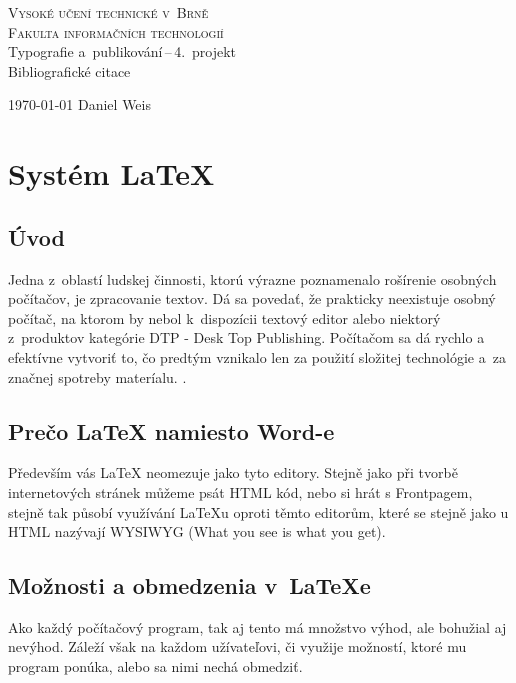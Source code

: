\documentclass[a4paper, 11pt]{article}
\begin{document}
	\begin{titlepage}
		\begin{center}
			\Huge
			\textsc{Vysoké učení technické v~Brně} \\
			\huge
			\textsc{Fakulta informačních technologií} \\
			\LARGE
			Typografie a~publikování\,--\,4.~projekt \\
			\Huge
			Bibliografické citace
		\end{center}

		{\Large
			\today
			\hfill
			Daniel Weis
		}
	\end{titlepage}


	
	\section{Systém \LaTeX}

	\subsection{Úvod}
	Jedna z~oblastí ludskej činnosti, ktorú výrazne poznamenalo rošírenie osobných počítačov, je zpracovanie 	textov. Dá sa povedať, že prakticky neexistuje osobný počítač, na ktorom by nebol k~dispozícii textový 			editor alebo niektorý z~produktov kategórie DTP - Desk Top Publishing. Počítačom sa dá rychlo a~ 				efektívne vytvoriť to, čo predtým vznikalo len za použití složitej technológie a~za značnej spotreby 			materíalu. \cite{Rybicka2003}.
	\subsection{Prečo {\LaTeX} namiesto Word-e}
	Především vás LaTeX neomezuje jako tyto editory. Stejně jako při tvorbě internetových stránek můžeme psát HTML kód, nebo si hrát s Frontpagem, stejně tak působí využívání LaTeXu oproti těmto editorům, které se stejně jako u HTML nazývají WYSIWYG (What you see is what you get). \cite{Simecek2013}

	\subsection{Možnosti a obmedzenia v~{\LaTeX}e}
	Ako každý počítačový program, tak aj tento má množstvo výhod, ale bohužial aj nevýhod. Záleží však na každom užívateľovi, či využije možností, ktoré mu program ponúka, alebo sa nimi nechá obmedziť.
\end{document}
